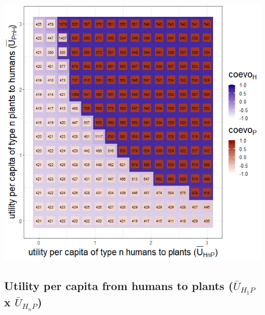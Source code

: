 \documentclass[
]{book}
\begin{document}

\includegraphics[width=1\linewidth]{plots/3_exp_utility_per_capita_type_n-tripleRaster_twoParameters}

\newpage

\hypertarget{utility-per-capita-from-humans-to-plants-baru_h_1p-x-baru_h_np}{%
\subsection{\texorpdfstring{Utility per capita from humans to plants (\(\bar{U}_{H_{1}P}\) x \(\bar{U}_{H_{n}P}\))}{Utility per capita from humans to plants (\textbackslash bar\{U\}\_\{H\_\{1\}P\} x \textbackslash bar\{U\}\_\{H\_\{n\}P\})}}\label{utility-per-capita-from-humans-to-plants-baru_h_1p-x-baru_h_np}}

\end{document}
